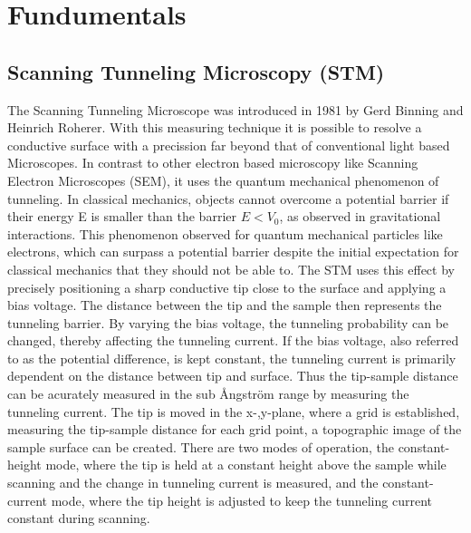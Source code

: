 \chapter{Fundumentals}
\label{sec:Fundumentals}
\section{Scanning Tunneling Microscopy (STM) }
The Scanning Tunneling Microscope was introduced in 1981 by Gerd Binning and Heinrich Roherer. 
With this measuring technique it is possible to resolve a conductive surface with a precission far beyond that of conventional light based Microscopes.
In contrast to other electron based microscopy like Scanning Electron Microscopes (SEM), it uses the quantum mechanical phenomenon of tunneling.
In classical mechanics, objects cannot overcome a potential barrier if their energy E is smaller than the barrier $E < V_0$, as observed in gravitational interactions.
This phenomenon observed for quantum mechanical particles like electrons, which can surpass a potential barrier despite the initial expectation for classical mechanics that they should not be able to.
The STM uses this effect by precisely positioning a sharp conductive tip close to the surface and applying a bias voltage.
The distance between the tip and  the sample then represents the tunneling barrier.
By varying the bias voltage, the tunneling probability can be changed, thereby affecting the tunneling current.
If the bias voltage, also referred to as the potential difference, is kept constant, the tunneling current is primarily dependent on the distance between tip and surface.
Thus the tip-sample distance can be acurately measured in the sub \AA ngström range by measuring the tunneling current.
The tip is moved in the x-,y-plane, where a grid is established, measuring the tip-sample distance for each grid point, a topographic image of the sample surface can be created. 
There are two modes of operation, the constant-height mode, where the tip is held at a constant height above the sample while scanning and the change in tunneling current is measured, and the constant-current mode, where the tip height is adjusted to keep the tunneling current constant during scanning.

